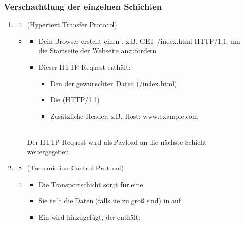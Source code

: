 \subsubsection*{Verschachtlung der einzelnen Schichten}
\begin{infoBox}[title=Das Beispiel: Aufruf einer Webseite]
    \begin{enumerate}
        \item {}
        \begin{itemize}
            \item {} (Hypertext Transfer Protocol)
            \item {}
            \begin{itemize}
                \item Dein Browser erstellt einen , z.B. GET /index.html HTTP/1.1, um die Startseite der Webseite anzufordern
                \item Dieser HTTP-Request enthält:
                \begin{itemize}
                    \item Den  der gewünschten Daten (/index.html)
                    \item Die  (HTTP/1.1)
                    \item Zusätzliche Header, z.B. Host: www.example.com
                \end{itemize}
            \end{itemize}
            \\
            Der HTTP-Request wird als Payload an die nächste Schicht weitergegeben
        \end{itemize}
        \item {}
        \begin{itemize}
            \item {} (Transmission Control Protocol)
            \item {}
            \begin{itemize}
                \item Die Transportschicht sorgt für eine 
                \item Sie teilt die Daten (falls sie zu groß sind) in  auf
                \item Ein  wird hinzugefügt, der enthält:

\end{itemize}
\end{itemize}
\end{enumerate}
\end{infoBox}
